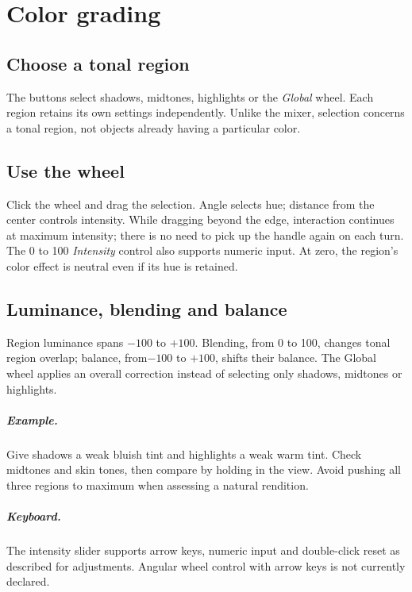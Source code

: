 \chapter{Color grading}
\section{Choose a tonal region}
The buttons select shadows, midtones, highlights or the \emph{Global} wheel.
Each region retains its own settings independently. Unlike the mixer,
selection concerns a tonal region, not objects already having a particular color.

\section{Use the wheel}
Click the wheel and drag the selection. Angle selects hue; distance from
the center controls intensity. While dragging beyond the edge, interaction
continues at maximum intensity; there is no need to pick up the handle
again on each turn. The 0 to 100 \emph{Intensity} control also supports numeric
input. At zero, the region's color effect is neutral even if its hue is retained.

\section{Luminance, blending and balance}
Region luminance spans $-100$ to  $+100$. Blending, from 0 to 100, changes tonal
region overlap; balance, from$-100$ to  $+100$, shifts their balance.
The Global wheel applies an overall correction instead of selecting only
shadows, midtones or highlights.

\paragraph{Example.}
Give shadows a weak bluish tint and highlights a weak warm tint. Check
midtones and skin tones, then compare by holding  in the view.
Avoid pushing all three regions to maximum when assessing a natural rendition.

\paragraph{Keyboard.}
The intensity slider supports arrow keys, numeric input and double-click
reset as described for adjustments. Angular wheel control with arrow keys
is not currently declared.

